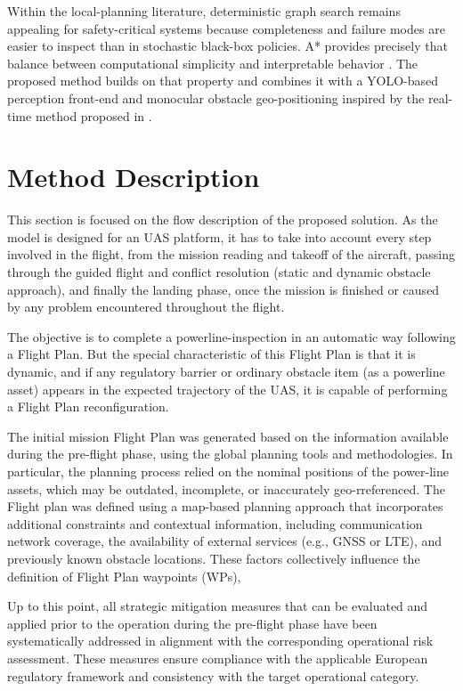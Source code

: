 \documentclass[a4paper,11pt]{article}
\begin{document}
Within the local-planning literature, deterministic graph search remains appealing for safety-critical systems because completeness and failure modes are easier to inspect than in stochastic black-box policies. A* provides precisely that balance between computational simplicity and interpretable behavior \cite{hart1968formal}. The proposed method builds on that property and combines it with a YOLO-based perception front-end \cite{ultralytics_yolo} and monocular obstacle geo-positioning inspired by the real-time method proposed in \cite{alaez2023real}.


\section{Method Description}

This section is focused on the flow description of the proposed solution. As the model is designed for an UAS platform, it has to take into account every step involved in the flight, from the mission reading and takeoff of the aircraft, passing through the guided flight and conflict resolution (static and dynamic obstacle approach), and finally the landing phase, once the mission is finished or caused by any problem encountered throughout the flight. 

The objective is to complete a powerline-inspection in an automatic way following a Flight Plan. But the special characteristic of this Flight Plan is that it is dynamic, and if any regulatory barrier or ordinary obstacle item (as a powerline asset) appears in the expected trajectory of the UAS, it is capable of performing a Flight Plan reconfiguration. 

The initial mission Flight Plan was generated based on the information available during the pre-flight phase, using the global planning tools and methodologies. In particular, the planning process relied on the nominal positions of the power-line assets, which may be outdated, incomplete, or inaccurately geo-rreferenced. The Flight plan was defined using a map-based planning approach that incorporates additional constraints and contextual information, including communication network coverage, the availability of external services (e.g., GNSS or LTE), and previously known obstacle locations. These factors collectively influence the definition of Flight Plan waypoints (WPs),

Up to this point, all strategic mitigation measures that can be evaluated and applied prior to the operation during the pre-flight phase have been systematically addressed in alignment with the corresponding operational risk assessment. These measures ensure compliance with the applicable European regulatory framework and consistency with the target operational category. 
\end{document}
